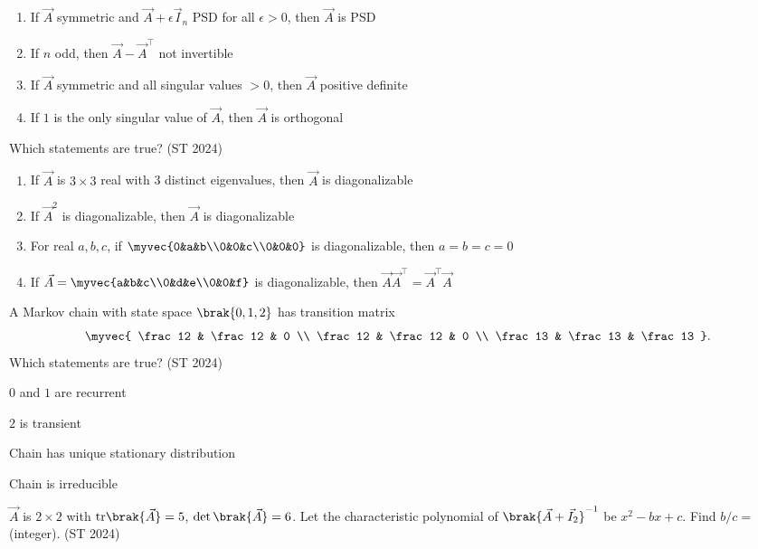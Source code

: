 \begin{enumerate}
\item If $\vec{A}$ symmetric and $\vec{A}+\epsilon \vec{I}_n$ PSD for all $\epsilon>0$, then $\vec{A}$ is PSD  
\item If $n$ odd, then $\vec{A}-\vec{A}^\top$ not invertible  
\item If $\vec{A}$ symmetric and all singular values $>0$, then $\vec{A}$ positive definite  
\item If $1$ is the only singular value of $\vec{A}$, then $\vec{A}$ is orthogonal
\end{enumerate}
\item
Which statements are true?
\hfill (ST 2024)
\begin{enumerate}
\item If $\vec{A}$ is $3\times3$ real with 3 distinct eigenvalues, then $\vec{A}$ is diagonalizable
\item If $\vec{A}^2$ is diagonalizable, then $\vec{A}$ is diagonalizable
\item For real $a,b,c$, if $\myvec{0&a&b\\0&0&c\\0&0&0}$ is diagonalizable, then $a=b=c=0$
\item If $\vec{A}=\myvec{a&b&c\\0&d&e\\0&0&f}$ is diagonalizable, then $\vec{A}\vec{A}^\top = \vec{A}^\top \vec{A}$
\end{enumerate}
\item
A Markov chain with state space $\brak{0,1,2}$ has transition matrix
$$
\myvec{
\frac12 & \frac12 & 0 \\
\frac12 & \frac12 & 0 \\
\frac13 & \frac13 & \frac13
}.
$$
Which statements are true?
\hfill (ST 2024)
\begin{enumerate}
\begin{multicols}{2}
\item $0$ and $1$ are recurrent
\item $2$ is transient
\item Chain has unique stationary distribution
\item Chain is irreducible
\end{multicols}
\end{enumerate}
\item
$\vec{A}$ is $2\times2$ with $\mathrm{tr}\brak{\vec{A}}=5$, $\det\brak{\vec{A}}=6$. Let the characteristic polynomial of $\brak{\vec{A}+\vec{I}_2}^{-1}$ be $x^2 - b x + c$.  
Find $b/c =$ \underline{\phantom{imagine}} (integer).
\hfill (ST 2024)

